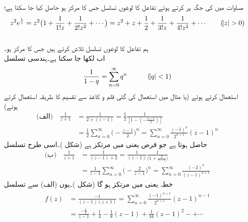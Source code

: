 \quad
مساوات  میں  کی جگہ  پر کرتے ہوئے  تفاعل  کا لوغوں تسلسل جس کا مرکز  ہو  حاصل کیا جا سکتا ہے؛
\begin{align*}
z^2e^{\frac{1}{z}}=z^2\big(1+\frac{1}{1!z}+\frac{1}{2!z^2}+\cdots\big)=z^2+z+\frac{1}{2}+\frac{1}{3!z}+\frac{1}{4!z^2}+\cdots\quad \quad (\abs{z}>0)
\end{align*}
\quad {}\\
ہم تفاعل  کا لوغوں تسلسل تلاش کرتے ہیں جس کا مرکز  ہو۔\\
اب  لکھا جا سکتا ہے۔ہندسی تسلسل
\begin{align*}
\frac{1}{1-q}=\sum\limits_{n=0}^{\infty} q^n\quad \quad \quad (\abs{q}<1)
\end{align*}
استعمال کرتے ہوئے  (یا مثال  میں استعمال کی گئی قلم و کاغذ سے تقسیم کا طریقہ استعمال کرتے ہوئے)
\begin{align*}
\text{(الف)}\quad \frac{1}{z+1}&=\frac{1}{2+(z-1)}=\frac{1}{2}\frac{1}{[1-(-\frac{z-1}{2})]}\\
&=\frac{1}{2}\sum\limits_{n=0}^{\infty}\big(-\frac{z-1}{2}\big)^n=\sum\limits_{n=0}^{\infty} \frac{(-1)^n}{2^{n+1}}(z-1)^n
\end{align*}
حاصل ہوتا ہے جو قرص  یعنی  میں مرتکز ہے (شکل )۔اسی طرح  تسلسل
\begin{align*}
\text{(ب)}\quad \frac{1}{z+1}&=\frac{1}{(z-1)+2}=\frac{1}{(z-1)}\frac{1}{\big(1+\frac{2}{z-1}\big)}\\
&=\frac{1}{z-1}\sum\limits_{n=0}^{\infty} \big(-\frac{2}{z-1}\big)^n=\sum\limits_{n=0}^{\infty}\frac{(-2)^n}{(z-1)^{n+1}}
\end{align*}
خطہ   یعنی  میں مرتکز ہو گا (شکل )۔یوں (الف) سے  تسلسل
\begin{gather}
\begin{aligned}\label{مساوات_ٹیلر_چھلا_پہلا}
f(z)&=\frac{-1}{(z-1)(z+1)}=\sum\limits_{n=0}^{\infty} \frac{(-1)^{n+1}}{2^{n+1}}(z-1)^{n-1}\\
&=\frac{-\tfrac{1}{2}}{z-1}+\frac{1}{4}-\frac{1}{8}(z-1)+\frac{1}{16}(z-1)^2-+\cdots
\end{aligned}
\end{gather}
